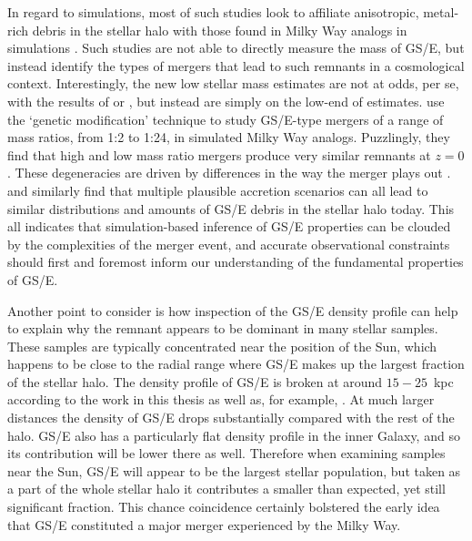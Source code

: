 In regard to simulations, most of such studies look to affiliate anisotropic, metal-rich debris in the stellar halo with those found in Milky Way analogs in simulations \parencite[e.g.][]{fattahi19,mackereth19a}. Such studies are not able to directly measure the mass of GS/E, but instead identify the types of mergers that lead to such remnants in a cosmological context. Interestingly, the new low stellar mass estimates are not at odds, per se, with the results of \textcite{fattahi19} or \textcite{mackereth19a}, but instead are simply on the low-end of estimates. \textcite{rey23} use the `genetic modification' technique \parencite{stopyra21,rey22} to study GS/E-type mergers of a range of mass ratios, from 1:2 to 1:24, in simulated Milky Way analogs. Puzzlingly, they find that high and low mass ratio mergers produce very similar remnants at $z=0$. These degeneracies are driven by differences in the way the merger plays out \parencite[see also][]{jean-baptiste17}. \textcite{grand20} and \textcite{orkney22} similarly find that multiple plausible accretion scenarios can all lead to similar distributions and amounts of GS/E debris in the stellar halo today. This all indicates that simulation-based inference of GS/E properties can be clouded by the complexities of the merger event, and accurate observational constraints should first and foremost inform our understanding of the fundamental properties of GS/E.

Another point to consider is how inspection of the GS/E density profile can help to explain why the remnant appears to be dominant in many stellar samples. These samples are typically concentrated near the position of the Sun, which happens to be close to the radial range where GS/E makes up the largest fraction of the stellar halo. The density profile of GS/E is broken at around $15-25$~kpc according to the work in this thesis as well as, for example, \textcite{han22}. At much larger distances the density of GS/E drops substantially compared with the rest of the halo. GS/E also has a particularly flat density profile in the inner Galaxy, and so its contribution will be lower there as well. Therefore when examining samples near the Sun, GS/E will appear to be the largest stellar population, but taken as a part of the whole stellar halo it contributes a smaller than expected, yet still significant fraction. This chance coincidence certainly bolstered the early idea that GS/E constituted a major merger experienced by the Milky Way.

